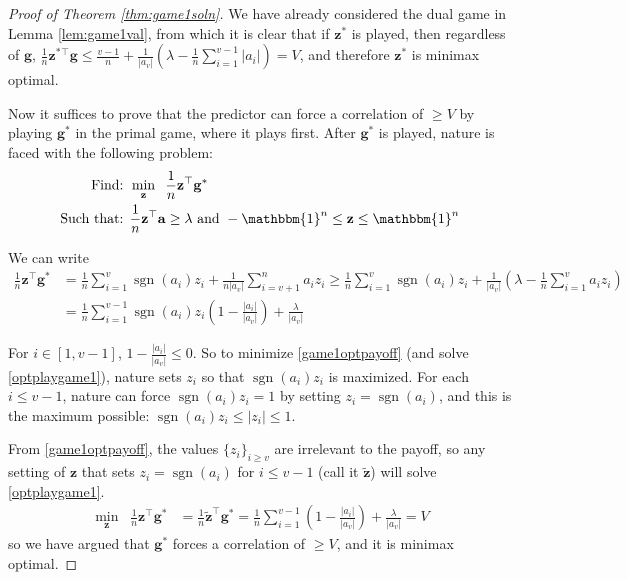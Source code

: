 \documentclass{article}[12pt]
\theoremstyle{named}
\newcommand{\ones}[1]{\mathbbm{1}^{#1}}
\newcommand{\va}{\mathbf{a}}
\newcommand{\vg}{\mathbf{g}}    %
\newcommand{\vz}{\mathbf{z}}
\DeclareMathOperator{\sgn}{sgn}
\newcommand{\abs}[1]{\left| #1 \right|}
\newcommand{\lrp}[1]{\left(#1\right)}
\begin{document}
\begin{proof}[Proof of Theorem \ref{thm:game1soln}]
We have already considered the dual game in Lemma \ref{lem:game1val}, 
from which it is clear that if $\vz^*$ is played, then regardless of $\vg$,
$\frac{1}{n} \vz^*{^\top} \vg \leq \frac{v-1}{n} + \frac{1}{\abs{a_v}} \lrp{ \lambda - \frac{1}{n} \sum_{i=1}^{v-1} \abs{a_i} } = V$, 
and therefore $\vz^*$ is minimax optimal.

Now it suffices to prove that the predictor can force a correlation of $\geq V$ by playing $\vg^*$ in the primal game, 
where it plays first. 
After $\vg^*$ is played, 
nature is faced with the following problem:
\begin{eqnarray}
\mbox{Find: }&\displaystyle \min_{\vz} \;\; \frac{1}{n} \vz^\top \vg^* \label{optplaygame1}\\
\mbox{Such that: }& \frac{1}{n} \vz^\top \va \geq \lambda \mbox{ and } -\ones{n} \leq \vz \leq \ones{n} \notag
\end{eqnarray}

We can write
\begin{align}
\label{game1optpayoff}
\frac{1}{n} \vz^\top \vg^* &= \frac{1}{n} \sum_{i=1}^{v} \sgn(a_i) z_i + \frac{1}{n \abs{a_v}} \sum_{i=v+1}^{n} a_i z_i 
\geq \frac{1}{n} \sum_{i=1}^{v} \sgn(a_i) z_i + \frac{1}{\abs{a_v}} \lrp{ \lambda - \frac{1}{n} \sum_{i=1}^{v} a_i z_i } \nonumber \\
&= \frac{1}{n} \sum_{i=1}^{v-1} \sgn(a_i) z_i \lrp{1 - \frac{\abs{a_i}}{\abs{a_v}}} + \frac{\lambda}{\abs{a_v}}
\end{align}

For $i \in [1, v-1]$, $1 - \frac{\abs{a_i}}{\abs{a_v}} \leq 0$. 
So to minimize \eqref{game1optpayoff} (and solve \eqref{optplaygame1}), 
nature sets $z_i$ so that $\sgn(a_i) z_i$ is maximized. 
For each $i \leq v-1$, 
nature can force $\sgn(a_i) z_i = 1$ by setting $z_i = \sgn(a_i)$, 
and this is the maximum possible: $\sgn(a_i) z_i \leq \abs{z_i} \leq 1$. 

From \eqref{game1optpayoff}, the values $\{z_i \}_{i \geq v}$ are irrelevant to the payoff, 
so any setting of $\vz$ that sets $z_i = \sgn(a_i)$ for $i \leq v-1$ 
(call it $\tilde{\vz}$) will solve \eqref{optplaygame1}. 
\begin{align*}
\min_{\vz} \;\; \frac{1}{n} \vz^\top \vg^* &= \frac{1}{n} \tilde{\vz}^\top \vg^*
= \frac{1}{n} \sum_{i=1}^{v-1} \lrp{1 - \frac{\abs{a_i}}{\abs{a_v}}} + \frac{\lambda}{\abs{a_v}} = V
\end{align*}
so we have argued that $\vg^*$ forces a correlation of $\geq V$, and it is minimax optimal.
\end{proof}
\end{document}
